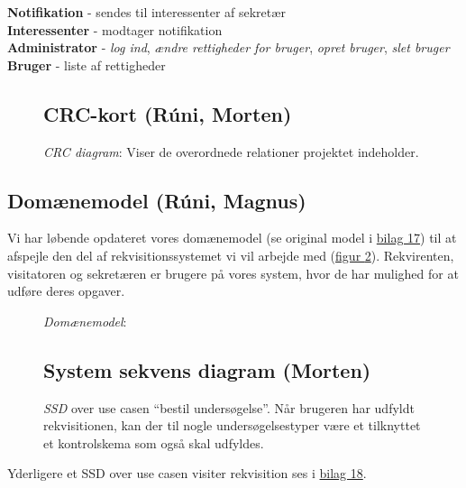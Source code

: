 \textbf{Notifikation} - sendes til interessenter af sekretær\\
\textbf{Interessenter} - modtager notifikation\\ 
\textbf{Administrator} - \emph{log ind}, \emph{ændre rettigheder for bruger},
\emph{opret bruger}, \emph{slet bruger}\\
\textbf{Bruger} - liste af rettigheder
\FloatBarrier
\begin{figure}[h]
\subsection*{CRC-kort (Rúni, Morten)}
\centering
{}
\caption{\emph{CRC diagram}: Viser de overordnede relationer projektet
indeholder. \label{crc_kort}}
\end{figure}
\FloatBarrier
\subsection*{Domænemodel (Rúni, Magnus)}
Vi har løbende opdateret vores domænemodel (se original model i
\hyperref[Bilag17]{bilag 17}) til at afspejle den del af rekvisitionssystemet vi
vil arbejde med (\hyperref[domainmodel]{figur \ref*{domainmodel}}).
Rekvirenten, visitatoren og sekretæren er brugere på vores system, hvor de har
mulighed for at udføre deres opgaver.
\FloatBarrier
\begin{figure}[h]
\centering
{}
\caption{\emph{Domænemodel}: \label{domainmodel}}
\end{figure}
\FloatBarrier
\begin{figure}[h]
\subsection*{System sekvens diagram (Morten)}
\centering
{}
\caption{\emph{SSD} over use casen “bestil undersøgelse”. Når brugeren har
udfyldt rekvisitionen, kan der til nogle undersøgelsestyper være et tilknyttet
et kontrolskema som også skal udfyldes. \label{ssd_1}}
\end{figure}
Yderligere et SSD over use casen visiter rekvisition ses i
\hyperref[Bilag18]{bilag 18}.
\FloatBarrier
